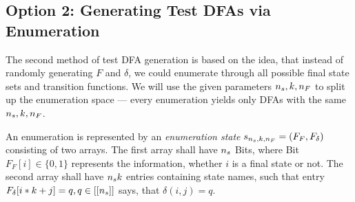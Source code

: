 \subsection{Option 2: Generating Test DFAs via Enumeration}


The second method of test DFA generation is based on the idea, that instead of randomly generating $F$ and $\delta$, we could enumerate through all possible final state sets and transition functions. We will use the given parameters ${n_s}, k, {n_F}$ to split up the enumeration space --- every enumeration yields only DFAs with the same ${n_s}, k, {n_F}$.


An enumeration is represented by an \emph{enumeration state} $s_{{n_s}, k, {n_F}} = (F_F,F_\delta)$ consisting of two arrays\footnotemark. The first array shall have ${n_s}$ Bits, where Bit $F_F[i] \in \{0,1\}$ represents the information, whether $i$ is a final state or not. The second array shall have ${n_s}k$ entries containing state names, such that entry $F_\delta[i * k + j] = q, q\in [[{n_s}]]$ says, that $\delta(i, j) = q$.



